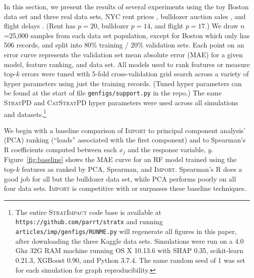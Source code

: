 \documentclass[11pt]{article}
\newcommand{\figref}[1]{Figure~\ref{#1}}
\newcommand{\cut}[1]{}
\newcommand{\Impo}{\fontfamily{cmr}\textsc{Import}}
\newcommand{\simp}{\fontfamily{cmr}\textsc{\small StratImpact}}
\newcommand{\spd}{\fontfamily{cmr}\textsc{\small StratPD}}
\newcommand{\cspd}{\fontfamily{cmr}\textsc{\small CatStratPD}}
\begin{document}
In this section, we present the results of several experiments using the toy Boston data set and three real data sets, NYC rent prices \citep{rent}, bulldozer auction sales \citep{bulldozer}, and flight delays \citep{flights}. (Rent has $p=20$, bulldozer $p=14$, and flight $p=17$.) We draw $n$=25,000 samples from each data set population, except for Boston which only has 506 records, and split into 80\% training / 20\% validation sets. Each point on an error curve represents the validation set mean absolute error (MAE) for a given model, feature ranking, and data set. All models used to rank features or measure top-$k$ errors were tuned with 5-fold cross-validation grid search across a variety of hyper parameters using just the training records. (Tuned hyper parameters can be found at the start of file {\tt\small genfigs/support.py} in the repo.) The same \spd{} and \cspd{} hyper parameters were used across all simulations and datasets.\footnote{
The entire \simp{} code base is available at {\tt\small https://github.com/parrt/stratx} and running {\tt\small articles/imp/genfigs/RUNME.py} will regenerate all figures in this paper, after downloading the three Kaggle data sets.  Simulations were run on a 4.0 Ghz 32G RAM machine running OS X 10.13.6 with SHAP 0.35, scikit-learn 0.21.3, XGBoost 0.90, and Python 3.7.4. The same random seed of 1 was set for each simulation for graph reproducibility.}

We begin with a baseline comparison of \Impo{} to principal component analysis' (PCA) ranking (``loads'' associated with the first component) and to Spearman's R coefficients computed between each $x_j$ and the response variable, $y$.  \figref{fig:baseline} shows the MAE curve for an RF model trained using the top-$k$ features as ranked by PCA, Spearman, and \Impo. Spearman's R does a good job for all but the bulldozer data set, while PCA performs poorly on all four data sets. \Impo{} is competitive with or surpasses these baseline techniques. 

\cut{
\figref{fig:baseline} also shows the error curve for the features ranked by ordinary least squares (OLS); a feature's score is its $\beta$ coefficient divided by its standard error. (OLS is not applicable to the bulldozer data set because it has many high-cardinality categorical explanatory variables, which would create tens of thousands of dummy variables.) 

OLS curves are similar to \Impo's except for rent in \figref{fig:baseline}d and are included as a common reference curve on subsequent graphs.
}
\end{document}
